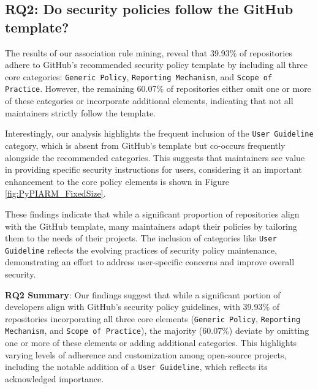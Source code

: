


\subsection{RQ2: Do security policies follow the GitHub template?}

The results of our association rule mining, reveal that 39.93\% of repositories adhere to GitHub's recommended security policy template by including all three core categories: \texttt{Generic Policy}, \texttt{Reporting Mechanism}, and \texttt{Scope of Practice}. However, the remaining 60.07\% of repositories either omit one or more of these categories or incorporate additional elements, indicating that not all maintainers strictly follow the template.

Interestingly, our analysis highlights the frequent inclusion of the \texttt{User Guideline} category, which is absent from GitHub's template but co-occurs frequently alongside the recommended categories. This suggests that maintainers see value in providing specific security instructions for users, considering it an important enhancement to the core policy elements is shown in Figure \ref{fig:PyPIARM_FixedSize}.

These findings indicate that while a significant proportion of repositories align with the GitHub template, many maintainers adapt their policies by tailoring them to the needs of their projects. The inclusion of categories like \texttt{User Guideline} reflects the evolving practices of security policy maintenance, demonstrating an effort to address user-specific concerns and improve overall security.

\begin{tcolorbox}[] \textbf{RQ2 Summary}: Our findings suggest that while a significant portion of developers align with GitHub's security policy guidelines, with 39.93\% of repositories incorporating all three core elements (\texttt{Generic Policy}, \texttt{Reporting Mechanism}, and \texttt{Scope of Practice}), the majority (60.07\%) deviate by omitting one or more of these elements or adding additional categories. This highlights varying levels of adherence and customization among open-source projects, including the notable addition of a \texttt{User Guideline}, which reflects its acknowledged importance. \end{tcolorbox}

